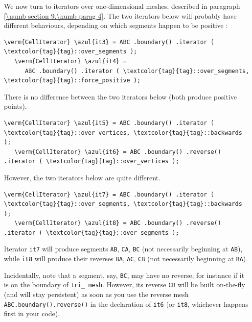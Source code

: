 We now turn to iterators over one-dimensional meshes, described in paragraph
\ref{\numb section 9.\numb parag 4}.
The two iterators below will probably have different behaviours,
depending on which segments happen to be positive :

\begin{Verbatim}[commandchars=\\\{\},formatcom=\small\tt,
   baselinestretch=0.94,framesep=2mm                      ]
   \verm{CellIterator} \azul{it3} = ABC .boundary() .iterator ( \textcolor{tag}{tag}::over_segments );
   \verm{CellIterator} \azul{it4} =
      ABC .boundary() .iterator ( \textcolor{tag}{tag}::over_segments, \textcolor{tag}{tag}::force_positive );
\end{Verbatim}

There is no difference between the two iterators below (both produce positive
points).

\begin{Verbatim}[commandchars=\\\{\},formatcom=\small\tt,
   baselinestretch=0.94,framesep=2mm                      ]
   \verm{CellIterator} \azul{it5} = ABC .boundary() .iterator ( \textcolor{tag}{tag}::over_vertices, \textcolor{tag}{tag}::backwards );
   \verm{CellIterator} \azul{it6} = ABC .boundary() .reverse() .iterator ( \textcolor{tag}{tag}::over_vertices );
\end{Verbatim}

However, the two iterators below are quite different.

\begin{Verbatim}[commandchars=\\\{\},formatcom=\small\tt,
   baselinestretch=0.94,framesep=2mm                      ]
   \verm{CellIterator} \azul{it7} = ABC .boundary() .iterator ( \textcolor{tag}{tag}::over_segments, \textcolor{tag}{tag}::backwards );
   \verm{CellIterator} \azul{it8} = ABC .boundary() .reverse() .iterator ( \textcolor{tag}{tag}::over_segments );
\end{Verbatim}

Iterator {\small\tt it7} will produce segments {\small\tt AB}, {\small\tt CA}, {\small\tt BC}
(not necessarily beginning at {\small\tt AB}), while {\small\tt it8} will produce their reverses
{\small\tt BA}, {\small\tt AC}, {\small\tt CB} (not necessarily beginning at {\small\tt BA}).

Incidentally, note that a segment, say, {\small\tt BC}, may have no reverse,
for instance if it is on the boundary of {\small\tt tri\_\,mesh}.
However, its reverse {\small\tt CB} will be built on-the-fly (and will stay persistent)
as soon as you use the reverse mesh {\small\tt ABC.boundary().reverse()} in the declaration of
{\small\tt it6} (or {\small\tt it8}, whichever happens first in your code).


